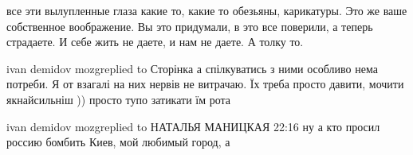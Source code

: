 все эти вылупленные глаза какие то, какие то обезьяны, карикатуры. Это же ваше
собственное воображение. Вы это придумали, в это все поверили, а теперь
страдаете. И себе жить не даете, и нам не даете. А толку то.

ivan demidov mozgreplied to Сторінка
а спілкуватись з ними особливо нема потреби. Я от взагалі на них нервів не
витрачаю. Їх треба просто давити, мочити якнайсильніш )) просто тупо затикати
їм рота


















ivan demidov mozgreplied to НАТАЛЬЯ МАНИЦКАЯ
22:16
ну а кто просил россию бомбить Киев, мой любимый город, а

